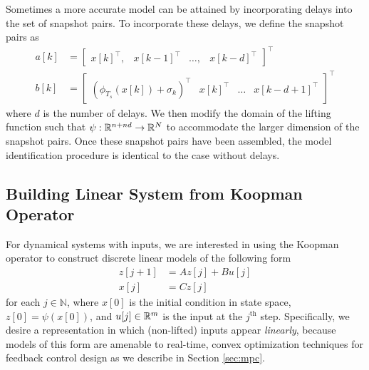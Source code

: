 Sometimes a more accurate model can be attained by incorporating delays into the set of snapshot pairs. 
To incorporate these delays, we define the snapshot pairs as
\begin{align}
    a[k] &= \begin{bmatrix} x[k]^\top, & x[k-1]^\top & \ldots, & x[k-d]^\top \end{bmatrix}^\top \label{eq:snapd1} \\
    b[k] &= \begin{bmatrix} \left( \phi_{T_s} (x[k]) + \sigma_k \right)^\top & x[k]^\top & \ldots & x[k-d+1]^\top \end{bmatrix}^\top \label{eq:snapd2}
\end{align}
where $d$ is the number of delays.
We then modify the domain of the lifting function such that $\psi : \mathbb{R}^{n+nd} \to \mathbb{R}^{N}$ to accommodate the larger dimension of the snapshot pairs.
Once these snapshot pairs have been assembled, the model identification procedure is identical to the case without delays.

\subsection{Building Linear System from Koopman Operator}

For dynamical systems with inputs, we are interested in using the Koopman operator to construct discrete linear models of the following form
\begin{equation}
\begin{aligned}
    z[j+1] &= A z[j] + B u[j] \\
    x[j] &= C z[j]
    \label{eq:linSys}
\end{aligned}
\end{equation}
 for each $j \in \mathbb{N}$, where $x[0]$ is the initial condition in state space, $z[0] = \psi(x[0])$, and $u[j] \in \mathbb{R}^m$ is the input at the $j^{\text{th}}$ step.
Specifically, we desire a representation in which (non-lifted) inputs appear \emph{linearly}, because models of this form are amenable to real-time, convex optimization techniques for feedback control design as we describe in Section \ref{sec:mpc}.

